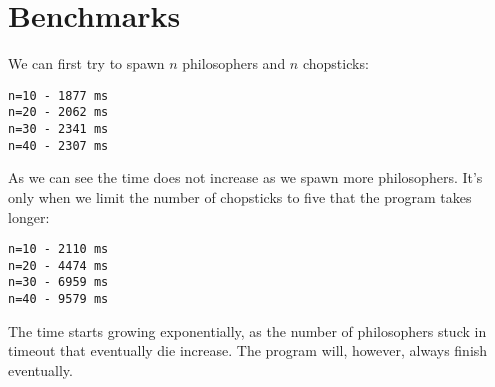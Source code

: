 \documentclass[a4paper,11pt]{article}
\begin{document}
\section*{Benchmarks}

We can first try to spawn $n$ philosophers and $n$ chopsticks:
\begin{verbatim}
n=10 - 1877 ms
n=20 - 2062 ms
n=30 - 2341 ms
n=40 - 2307 ms
\end{verbatim}

As we can see the time does not increase as we spawn more philosophers. It's only when we limit the number of chopsticks to five that the program takes longer:
\begin{verbatim}
n=10 - 2110 ms
n=20 - 4474 ms
n=30 - 6959 ms
n=40 - 9579 ms
\end{verbatim}

The time starts growing exponentially, as the number of philosophers stuck in timeout that eventually die increase. The program will, however, always finish eventually.
\end{document}
